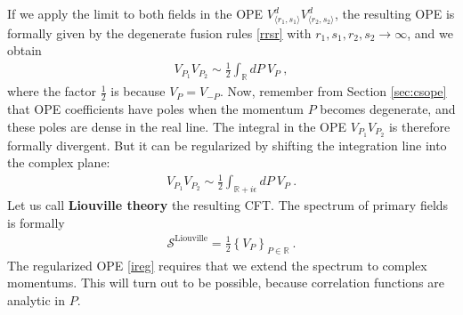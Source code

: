 \documentclass[12pt, a4paper]{article}
\theoremstyle{break}
\begin{document}
If we apply the limit to both fields in the OPE $V^d_{\langle r_1,s_1\rangle}V^d_{\langle r_2,s_2\rangle}$, the resulting OPE is formally given by the degenerate fusion rules \eqref{rrsr} with $r_1,s_1,r_2,s_2\to\infty$, and we obtain
\begin{align}
 \boxed{V_{P_1}V_{P_2} \sim \frac12 \int_\mathbb{R} dP\ V_P} \ ,
 \label{idpv}
\end{align}
where the factor $\frac12$ is because $V_P=V_{-P}$. Now, remember from Section \ref{sec:csope} that OPE coefficients have poles when the momentum $P$ becomes degenerate, and these poles are dense in the real line. The integral in the OPE $V_{P_1}V_{P_2}$ is therefore formally divergent. But it can be regularized by shifting the integration line into the complex plane:
\begin{align}
 V_{P_1}V_{P_2} \sim \frac12 \int_{\mathbb{R}+i\epsilon} dP\ V_P\ .
 \label{ireg}
\end{align}
Let us call \textbf{Liouville theory} the resulting CFT. The spectrum of primary fields is formally
\begin{align}
 \boxed{\mathcal{S}^\text{Liouville} = \frac12 \left\{ V_P\right\}_{P\in \mathbb{R}}}\ .
 \label{sliou}
\end{align}
The regularized OPE \eqref{ireg} requires that we extend the spectrum to complex momentums. This will turn out to be possible, because correlation functions are analytic in $P$. 
\end{document}
